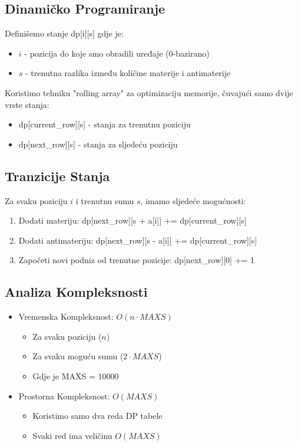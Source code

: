 \subsection{Dinamičko Programiranje}
Definišemo stanje dp[i][s] gdje je:
\begin{itemize}
    \item $i$ - pozicija do koje smo obradili uređaje (0-bazirano)
    \item $s$ - trenutna razlika između količine materije i antimaterije
\end{itemize}

Koristimo tehniku "rolling array" za optimizaciju memorije, čuvajući samo dvije vrste stanja:
\begin{itemize}
    \item dp[current\_row][s] - stanja za trenutnu poziciju
    \item dp[next\_row][s] - stanja za sljedeću poziciju
\end{itemize}

\subsection{Tranzicije Stanja}
Za svaku poziciju $i$ i trenutnu sumu $s$, imamo sljedeće mogućnosti:
\begin{enumerate}
    \item Dodati materiju: dp[next\_row][s + a[i]] += dp[current\_row][s]
    \item Dodati antimateriju: dp[next\_row][s - a[i]] += dp[current\_row][s]
    \item Započeti novi podniz od trenutne pozicije: dp[next\_row][0] += 1
\end{enumerate}

\subsection{Analiza Kompleksnosti}
\begin{itemize}
    \item Vremenska Kompleksnost: $O(n \cdot MAXS)$
        \begin{itemize}
            \item Za svaku poziciju ($n$)
            \item Za svaku moguću sumu ($2 \cdot MAXS$)
            \item Gdje je MAXS = 10000
        \end{itemize}
    \item Prostorna Kompleksnost: $O(MAXS)$
        \begin{itemize}
            \item Koristimo samo dva reda DP tabele
            \item Svaki red ima veličinu $O(MAXS)$
        \end{itemize}
\end{itemize}

